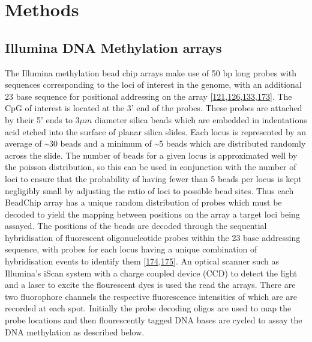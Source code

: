 \documentclass[
]{book}
\begin{document}
\hypertarget{methods}{%
\chapter{Methods}\label{methods}}

\hypertarget{GenMethodsMethArray}{%
\section{Illumina DNA Methylation arrays}\label{GenMethodsMethArray}}

The Illumina methylation bead chip arrays make use of 50 bp long probes with sequences corresponding to the loci of interest in the genome, with an additional 23 base sequence for positional addressing on the array {[}\protect\hyperlink{ref-Bibikova2006}{121},\protect\hyperlink{ref-Bibikova2009}{126},\protect\hyperlink{ref-Bibikova2011}{133},\protect\hyperlink{ref-Moran2015}{173}{]}.
The CpG of interest is located at the 3' end of the probes.
These probes are attached by their 5' ends to \(3\mu m\) diameter silica beads which are embedded in indentations acid etched into the surface of planar silica slides.
Each locus is represented by an average of \textasciitilde30 beads and a minimum of \textasciitilde5 beads which are distributed randomly across the slide.
The number of beads for a given locus is approximated well by the poisson distribution, so this can be used in conjunction with the number of loci to ensure that the probability of having fewer than 5 beads per locus is kept negligibly small by adjusting the ratio of loci to possible bead sites.
Thus each BeadChip array has a unique random distribution of probes which must be decoded to yield the mapping between positions on the array a target loci being assayed.
The positions of the beads are decoded through the sequential hybridisation of fluorescent oligonucleotide probes within the 23 base addressing sequence, with probes for each locus having a unique combination of hybridisation events to identify them {[}\protect\hyperlink{ref-Gunderson2004}{174},\protect\hyperlink{ref-Michael1998}{175}{]}.
An optical scanner such as Illumina's iScan system with a charge coupled device (CCD) to detect the light and a laser to excite the flourescent dyes is used the read the arrays.
There are two fluorophore channels the respective fluorescence intensities of which are are recorded at each spot.
Initially the probe decoding oligos are used to map the probe locations and then flourescently tagged DNA bases are cycled to assay the DNA methylation as described below.
\end{document}
